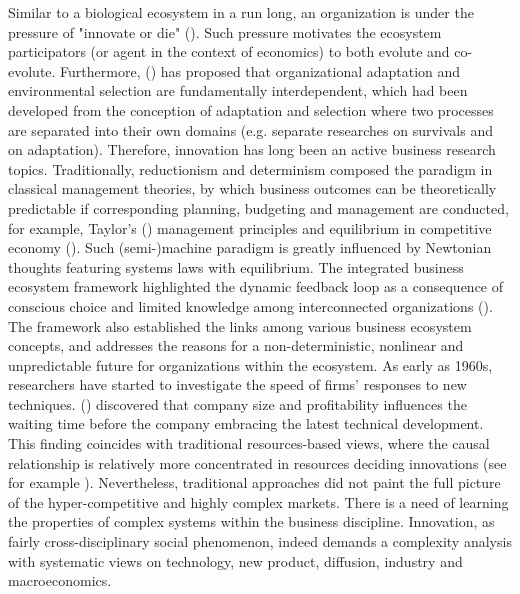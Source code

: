 \documentclass[utf8,english]{gradu3}
\begin{document}
Similar to a biological ecosystem in a run long, an organization is under the pressure of "innovate or die" (\cite{drucker1999knowledge}). Such pressure motivates the ecosystem participators (or agent in the context of economics) to both evolute and co-evolute. Furthermore, \citeauthor{levinthal1991organizational} (\citeyear{levinthal1991organizational}) has proposed that organizational adaptation and environmental selection are fundamentally interdependent, which had been developed from the conception of adaptation and selection where two processes are separated into their own domains (e.g. separate researches on survivals and on adaptation). Therefore, innovation has long been an active business research topics. Traditionally, reductionism and determinism composed the paradigm in classical management theories, by which business outcomes can be theoretically predictable if corresponding planning, budgeting and management are conducted, for example, Taylor's (\citeyear{taylor1911shop}) management principles and equilibrium in competitive economy (\cite{arrow1954existence}). Such (semi-)machine paradigm is greatly influenced by Newtonian thoughts featuring systems laws with equilibrium. The integrated business ecosystem framework highlighted the dynamic feedback loop as a consequence of conscious choice and limited knowledge among interconnected organizations (\cite{peltoniemi2006preliminary}). The framework also established the links among various business ecosystem concepts, and addresses the reasons for a non-deterministic, nonlinear and unpredictable future for organizations within the ecosystem. As early as 1960s, researchers have started to investigate the speed of firms' responses to new techniques. \citeauthor{mansfield1963speed} (\citeyear{mansfield1963speed}) discovered that company size and profitability influences the waiting time before the company embracing the latest technical development. This finding coincides with traditional resources-based views, where the causal relationship is relatively more concentrated in resources deciding innovations (see for example \cite{wernerfelt1984resource}). Nevertheless, traditional approaches did not paint the full picture of the hyper-competitive and highly complex markets. There is a need of learning the properties of complex systems within the business discipline. Innovation, as fairly cross-disciplinary social phenomenon, indeed demands a complexity analysis with systematic views on technology, new product, diffusion, industry and macroeconomics.
\end{document}
